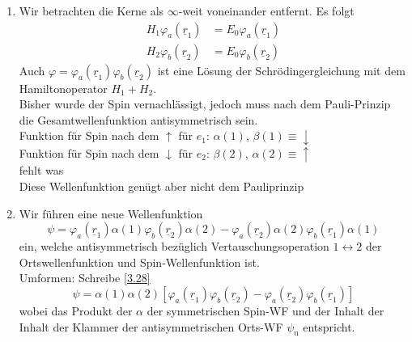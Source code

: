 \begin{enumerate}
	\item Wir betrachten die Kerne als $\infty$-weit voneinander entfernt. Es folgt
		\begin{align}
			\label{3.25}
			H_1 \varphi_{a} \left( \underline{r}_{1} \right) &= E_0 \varphi_{a} \left( \underline{r}_{1} \right)  \\
			\label{3.26}
			H_2 \varphi_{b}\left( \underline{r}_{2} \right) &= E_0 \varphi_{b} \left( \underline{r}_{2} \right)  
		\end{align}
		Auch $ \varphi = \varphi_{a}\left( \underline{r}_{1} \right) \varphi_{b} \left( \underline{r}_{2} \right) $ ist eine Lösung der Schrödingergleichung mit dem Hamiltonoperator $H_1 +H_2$.\\
Bisher wurde der Spin vernachlässigt, jedoch muss nach dem Pauli-Prinzip die Gesamtwellenfunktion antisymmetrisch sein.\\
Funktion für Spin nach dem $\uparrow$ für $e_{1}$: $ \alpha \left( 1 \right) $, $ \beta\left( 1 \right) \equiv \downarrow$ \\
Funktion für Spin nach dem $\downarrow$ für $e_{2}$: $ \beta \left( 2 \right) $, $ \alpha \left( 2 \right) \equiv \uparrow$\\
fehlt was\\
Diese Wellenfunktion genügt aber nicht dem Pauliprinzip\\
\item Wir führen eine neue Wellenfunktion 
\begin{equation}
	\label{3.28}
	\psi = \varphi_{a} \left( \underline{r}_{1} \right) \alpha\left( 1 \right) \varphi_{b} \left( \underline{r}_{2} \right) \alpha\left( 2 \right) - \varphi_{a} \left( \underline{r}_{2} \right) \alpha\left( 2 \right) \varphi_{b} \left( \underline{r}_{1} \right) \alpha\left( 1 \right) 
\end{equation}
ein, welche antisymmetrisch bezüglich Vertauschungsoperation $ 1 \leftrightarrow 2$ der Ortswellenfunktion und Spin-Wellenfunktion ist.\\
Umformen: Schreibe \ref{3.28}
\begin{equation}
	\label{3.29}
	\psi = \alpha \left( 1 \right) \alpha \left( 2 \right) \left[ \varphi_{a} \left( \underline{r}_{1} \right) \varphi_{b} \left( \underline{r}_{2} \right) - \varphi_{a} \left( \underline{r}_{2}  \right) \varphi_{b}\left( \underline{r}_{1} \right)  \right] 
\end{equation}
wobei das Produkt der $ \alpha$ der symmetrischen Spin-WF und der Inhalt der Inhalt der Klammer der antisymmetrischen Orts-WF $ \psi_{\text{u}}$ entspricht.

\end{enumerate}
